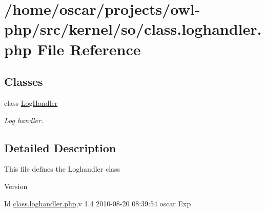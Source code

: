 \section{/home/oscar/projects/owl-\/php/src/kernel/so/class.loghandler.php File Reference}
\label{class_8loghandler_8php}
\subsection*{Classes}
\begin{DoxyCompactItemize}
\item 
class \hyperlink{classLogHandler}{LogHandler}
\begin{DoxyCompactList}\small\item\em Log handler. \item\end{DoxyCompactList}\end{DoxyCompactItemize}


\subsection{Detailed Description}
This file defines the Loghandler class \begin{DoxyVersion}{Version}

\end{DoxyVersion}
\begin{DoxyParagraph}{Id}
\hyperlink{class_8loghandler_8php}{class.loghandler.php},v 1.4 2010-\/08-\/20 08:39:54 oscar Exp 
\end{DoxyParagraph}
